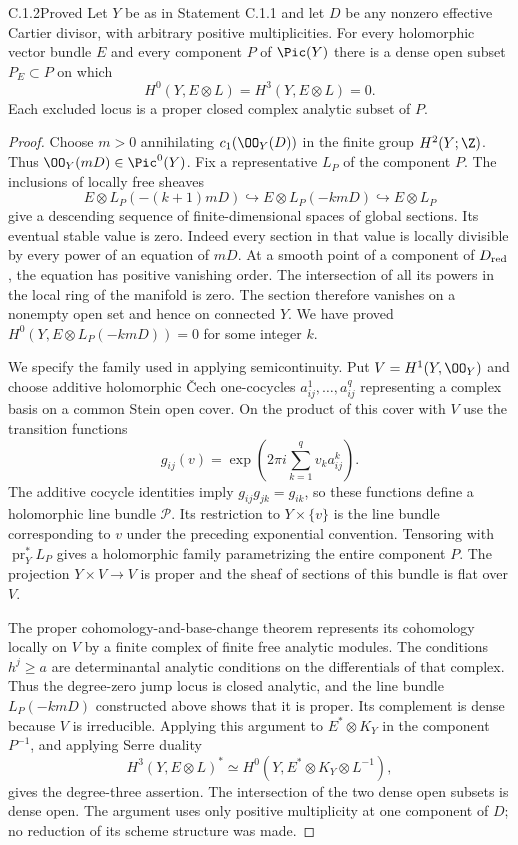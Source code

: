 \begin{idstatement}{C.1.2}{Proved}\label{st:C.1.2}
Let $Y$ be as in Statement C.1.1 and let $D$ be any nonzero effective
Cartier divisor, with arbitrary positive multiplicities. For every
holomorphic vector bundle $E$ and every component $P$ of $\Pic(Y)$ there
is a dense open subset $P_E\subset P$ on which
\[
 H^0(Y,E\otimes L)=H^3(Y,E\otimes L)=0.
\]
Each excluded locus is a proper closed complex analytic subset of $P$.
\end{idstatement}
\begin{proof}
Choose $m>0$ annihilating $c_1(\OO_Y(D))$ in the finite group
$H^2(Y;\Z)$. Thus $\OO_Y(mD)\in\Pic^0(Y)$. Fix a representative $L_P$
of the component $P$. The inclusions of locally free sheaves
\[
 E\otimes L_P(-(k+1)mD)\hookrightarrow E\otimes L_P(-kmD)
 \hookrightarrow E\otimes L_P
\]
give a descending sequence of finite-dimensional spaces of global
sections. Its eventual stable value is zero. Indeed every section in
that value is locally divisible by every power of an equation of
$mD$. At a smooth point of a component of $D_{\rm red}$, the equation
has positive vanishing order. The intersection of all its powers in
the local ring of the manifold is zero. The section therefore vanishes
on a nonempty open set and hence on connected $Y$. We have proved
$H^0(Y,E\otimes L_P(-kmD))=0$ for some integer $k$.

We specify the family used in applying semicontinuity. Put
$V=H^1(Y,\OO_Y)$ and choose additive holomorphic \v Cech
one-cocycles $a^1_{ij},\ldots,a^q_{ij}$ representing a complex basis
on a common Stein open cover. On the product of this cover with $V$
use the transition functions
\[
 g_{ij}(v)=\exp\left(2\pi i\sum_{k=1}^q v_k a^k_{ij}\right).
\]
The additive cocycle identities imply $g_{ij}g_{jk}=g_{ik}$,
so these functions define a holomorphic line bundle $\mathscr P$.
Its restriction to $Y\times\{v\}$ is the line bundle
corresponding to $v$ under the preceding exponential convention.
Tensoring with $\operatorname{pr}_Y^*L_P$ gives a holomorphic family
parametrizing the entire component $P$. The projection
$Y\times V\to V$ is proper and the sheaf of sections of this bundle
is flat over $V$.

The proper cohomology-and-base-change theorem represents its cohomology
locally on $V$ by a finite complex of finite free analytic modules.
The conditions $h^j\geq a$ are determinantal analytic conditions on
the differentials of that complex. Thus the degree-zero jump locus is
closed analytic, and the line bundle $L_P(-kmD)$ constructed above
shows that it is proper. Its complement is dense because $V$ is
irreducible. Applying this argument to $E^*\otimes K_Y$ in the
component $P^{-1}$, and applying Serre duality
\[
 H^3(Y,E\otimes L)^*
 \simeq H^0(Y,E^*\otimes K_Y\otimes L^{-1}),
\]
gives the degree-three assertion. The intersection of the two dense
open subsets is dense open. The argument uses only positive
multiplicity at one component of $D$; no reduction of its scheme
structure was made.
\end{proof}



